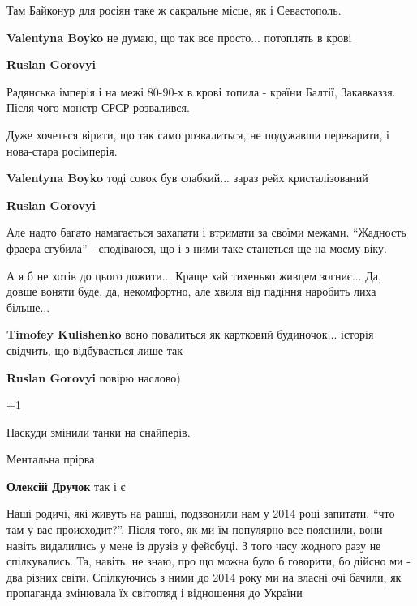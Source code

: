 \begin{itemize}
\begin{itemize}
Там Байконур для росіян таке ж сакральне місце, як і Севастополь.

\textbf{Valentyna Boyko} не думаю, що так все просто... потоплять в крові

\textbf{Ruslan Gorovyi} 

Радянська імперія і на межі 80-90-х в крові топила - країни Балтії, Закавказзя.
Після чого монстр СРСР розвалився.

Дуже хочеться вірити, що так само розвалиться, не подужавши переварити, і
нова-стара росімперія.

\textbf{Valentyna Boyko} тоді совок був слабкий... зараз рейх кристалізований

\textbf{Ruslan Gorovyi} 

Але надто багато намагається захапати і втримати за своїми межами. \enquote{Жадность
фраера сгубила} - сподіваюся, що і з ними таке станеться ще на моєму віку.

\end{itemize} %


А я б не хотів до цього дожити... Краще хай тихенько живцем зогниє... Да, довше
воняти буде, да, некомфортно, але хвиля від падіння наробить лиха більше...

\begin{itemize} %
\textbf{Timofey Kulishenko} воно повалиться як картковий будиночок... історія свідчить, що відбувається лише так

\textbf{Ruslan Gorovyi} повірю наслово)
\end{itemize} %

+1

Паскуди змінили танки на снайперів.

Ментальна прірва

\textbf{Олексій Дручок} так і є


Наші родичі, які живуть на рашці, подзвонили нам у 2014 році запитати, \enquote{что там
у вас происходит?}. Після того, як ми їм популярно все пояснили, вони навіть
видалились у мене із друзів у фейсбуці. З того часу жодного разу не
спілкувались. Та, навіть, не знаю, про що можна було б говорити, бо дійсно ми -
два різних світи. Спілкуючись з ними до 2014 року ми на власні очі бачили, як
пропаганда змінювала їх світогляд і відношення до України


\end{itemize}
